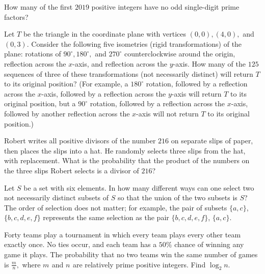 \documentclass{article}
\begin{document}
\begin{prob}{2}
How many of the first $2019$ positive integers have no odd single-digit prime factors?
\end{prob}
    
     \begin{prob}[AMC 10A 2020/23]{3}
Let $T$ be the triangle in the coordinate plane with vertices $(0,0), (4,0),$ and $(0,3).$ Consider the following five isometries (rigid transformations) of the plane: rotations of $90^{\circ}, 180^{\circ},$ and $270^{\circ}$ counterclockwise around the origin, reflection across the $x$-axis, and reflection across the $y$-axis. How many of the $125$ sequences of three of these transformations (not necessarily distinct) will return $T$ to its original position? (For example, a $180^{\circ}$ rotation, followed by a reflection across the $x$-axis, followed by a reflection across the $y$-axis will return $T$ to its original position, but a $90^{\circ}$ rotation, followed by a reflection across the $x$-axis, followed by another reflection across the $x$-axis will not return $T$ to its original position.)
\end{prob}
    
    \begin{prob}{3}
Robert writes all positive divisors of the number $216$ on separate slips of paper, then places the slips into a hat. He randomly selects three slips from the hat, with replacement. What is the probability that the product of the numbers on the three slips Robert selects is a divisor of $216$?
\end{prob}
    
    \begin{prob}[AIME 1993/8]{4}
Let $S$ be a set with six elements. In how many different ways can one select two not necessarily distinct subsets of $S$ so that the union of the two subsets is $S$? The order of selection does not matter; for example, the pair of subsets $\{a, c\}$, $\{b, c, d, e, f\}$ represents the same selection as the pair $\{b, c, d, e, f\}$, $\{a, c\}$.
\end{prob}
    
    \begin{req}[AIME 1999/13]{4}
Forty teams play a tournament in which every team plays every other team exactly once. No ties occur, and each team has a $50 \%$ chance of winning any game it plays. The probability that no two teams win the same number of games is $\frac mn,$ where $m_{}$ and $n_{}$ are relatively prime positive integers. Find $\log_2 n.$
\end{req}
    
\end{document}
